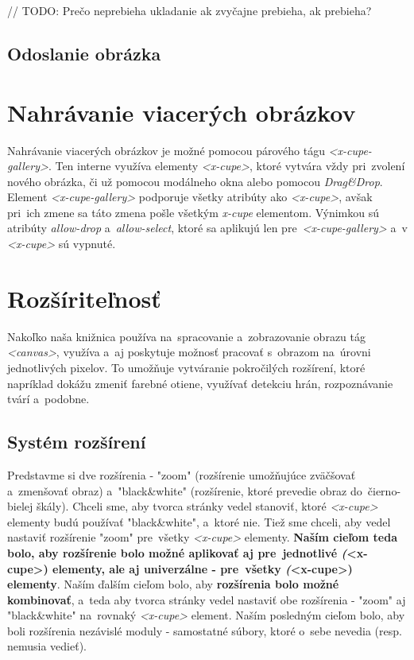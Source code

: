 // TODO: Prečo neprebieha ukladanie ak zvyčajne prebieha, ak prebieha?

\subsection{Odoslanie obrázka}

\section{Nahrávanie viacerých obrázkov}

Nahrávanie viacerých obrázkov je možné pomocou párového tágu \emph{<x-cupe-gallery>}. Ten interne využíva elementy \emph{<x-cupe>}, ktoré vytvára vždy pri~zvolení nového obrázka, či už pomocou modálneho okna alebo pomocou \emph{Drag&Drop}. Element \emph{<x-cupe-gallery>} podporuje všetky atribúty ako \emph{<x-cupe>}, avšak pri~ich zmene sa táto zmena pošle všetkým \emph{x-cupe} elementom. Výnimkou sú atribúty \emph{allow-drop} a~\emph{allow-select}, ktoré sa aplikujú len pre~\emph{<x-cupe-gallery>} a~v \emph{<x-cupe>} sú vypnuté.


\section{Rozšíriteľnosť}

Nakoľko naša knižnica používa na~spracovanie a~zobrazovanie obrazu tág \emph{<canvas>}, využíva a~aj poskytuje možnosť pracovať s~obrazom na~úrovni jednotlivých pixelov. To umožňuje vytváranie pokročilých rozšírení, ktoré napríklad dokážu zmeniť farebné otiene, využívať detekciu hrán, rozpoznávanie tvárí a~podobne.

\subsection{Systém rozšírení}

Predstavme si dve rozšírenia - "zoom" (rozšírenie umožňujúce zväčšovať a~zmenšovať obraz) a~"black\&white" (rozšírenie, ktoré prevedie obraz do~čierno-bielej škály). Chceli sme, aby tvorca stránky vedel stanoviť, ktoré \emph{<x-cupe>} elementy budú používať "black\&white", a~ktoré nie. Tiež sme chceli, aby vedel nastaviť rozšírenie "zoom" pre~všetky \emph{<x-cupe>} elementy. \textbf{Naším cieľom teda bolo, aby rozšírenie bolo možné aplikovať aj pre~jednotlivé \emph(<x-cupe>) elementy, ale aj univerzálne - pre~všetky \emph(<x-cupe>) elementy}. Naším ďalším cieľom bolo, aby \textbf{rozšírenia bolo možné kombinovať}, a~teda aby tvorca stránky vedel nastaviť obe rozšírenia - "zoom" aj "black\&white" na~rovnaký \emph{<x-cupe>} element. Naším posledným cieľom bolo, aby boli rozšírenia nezávislé moduly - samostatné súbory, ktoré o~sebe nevedia (resp. nemusia vedieť).

